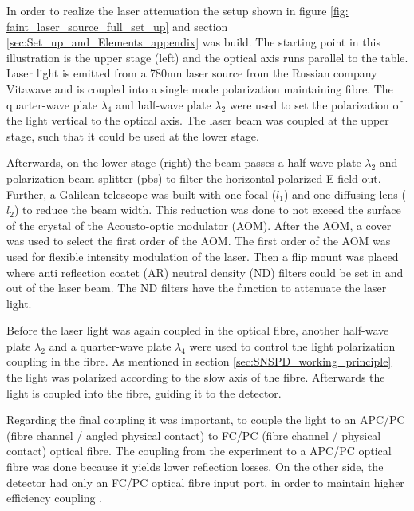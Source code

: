 
In order to realize the laser attenuation the setup shown in figure \ref{fig: faint_laser_source_full_set_up} and section
\ref{sec:Set_up_and_Elements_appendix} was build.
The starting point in this illustration is the upper stage (left) and the optical axis runs parallel to the table.
Laser light is emitted from a 780nm laser source from the Russian company Vitawave and
is coupled into a single mode polarization maintaining fibre.
The quarter-wave plate $\lambda_4$ and half-wave plate $\lambda_2$ were used to set the polarization of the light vertical
to the optical axis.
The laser beam was coupled at the upper stage, such that it could be used at the lower stage.

Afterwards, on the lower stage (right) the beam passes a half-wave plate $\lambda_2$ and polarization beam splitter (pbs) to filter the horizontal
polarized E-field out.
Further, a Galilean telescope was built with one focal ($l_1$) and one diffusing lens ($l_2$) to reduce the beam width.
This reduction was done to not exceed the surface of the crystal of the Acousto-optic modulator (AOM).
After the AOM, a cover was used to select the first order of the AOM.
The first order of the AOM was used for flexible intensity modulation of the laser.
Then a flip mount was placed where anti reflection coatet (AR) neutral density (ND) filters could be set in and out of the laser beam.
The ND filters have the function to attenuate the laser light.

Before the laser light was again coupled in the optical fibre, another half-wave plate $\lambda_2$ and a quarter-wave
plate $\lambda_4$ were used to control the light polarization coupling in the fibre.
As mentioned in section \ref{sec:SNSPD_working_principle} the light was polarized according to the slow axis of the fibre.
Afterwards the light is coupled into the fibre, guiding it to the detector.

Regarding the final coupling it was important, to couple the light to an APC/PC (fibre channel / angled physical contact) to FC/PC (fibre channel / physical contact) optical fibre.
The coupling from the experiment to a APC/PC optical fibre was done because it yields lower reflection losses.
On the other side, the detector had only an FC/PC optical fibre input port, in order to maintain higher efficiency coupling \cite{single-quantum-2022}.\\

